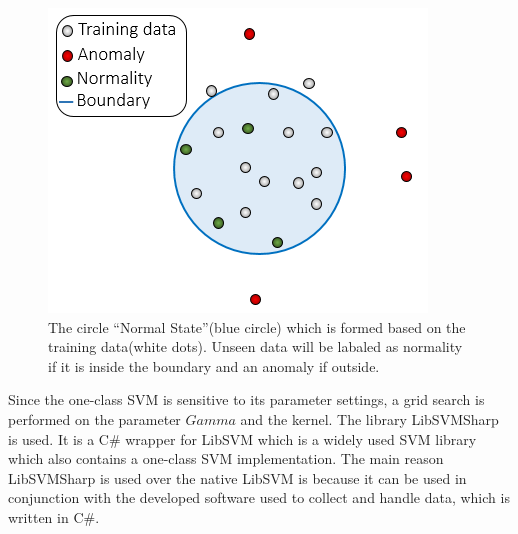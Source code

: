 \begin{figure}[H]
    \centering
  \includegraphics[width=0.75\columnwidth]{graphics/svm.png}
    \caption{The circle ``Normal State''(blue circle) which is formed based on the training data(white dots). Unseen data will be labaled as normality if it is inside the boundary and an anomaly if outside.}
    \label{[FIGURE] OneClass SVM}
\end{figure}

Since the one-class SVM is sensitive\cite{oneClassSVM} to its parameter settings, a grid search is performed on the parameter $Gamma$ and the kernel.
The library LibSVMSharp\cite{libsvmsharp} is used. It is a C\# wrapper for LibSVM\cite{libsvm} which is a widely used SVM library which also contains a one-class SVM implementation. The main reason LibSVMSharp is used over the native LibSVM is because it can be used in conjunction with the developed software used to collect and handle data, which is written in C\#.

